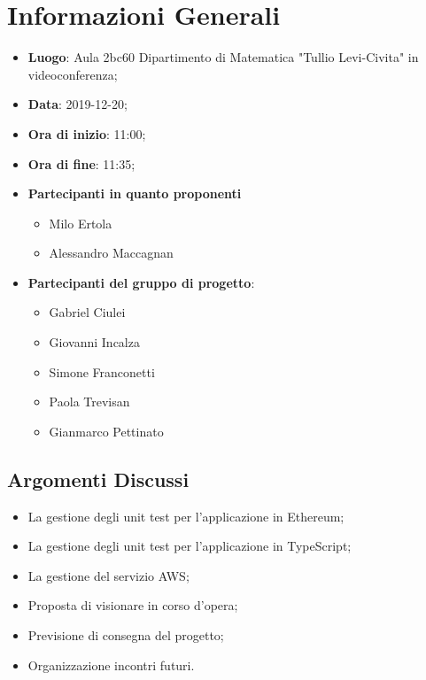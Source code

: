 \section{Informazioni Generali}
	\begin{itemize}
		\item \textbf {Luogo}: Aula 2bc60 Dipartimento di Matematica "Tullio Levi-Civita" in videoconferenza;
		\item \textbf {Data}: 2019-12-20;
		\item \textbf {Ora di inizio}: 11:00;
		\item \textbf {Ora di fine}: 11:35;
		\item \textbf {Partecipanti in quanto proponenti}
		  \begin{itemize}
		    \item Milo Ertola
		    \item Alessandro Maccagnan
		  \end{itemize}
		\item \textbf {Partecipanti del gruppo di progetto}: 
			\begin{itemize}
				\item Gabriel Ciulei
				\item Giovanni Incalza
				\item Simone Franconetti
				\item Paola Trevisan
				\item Gianmarco Pettinato
			\end{itemize}
	\end{itemize}
\subsection{Argomenti Discussi}
	\begin{itemize}
		\item La gestione degli unit test per l'applicazione in Ethereum;
		\item La gestione degli unit test per l'applicazione in TypeScript;
		\item La gestione del servizio AWS;
		\item Proposta di visionare in corso d'opera;
		\item Previsione di consegna del progetto;
		\item Organizzazione incontri futuri.
	\end{itemize}
